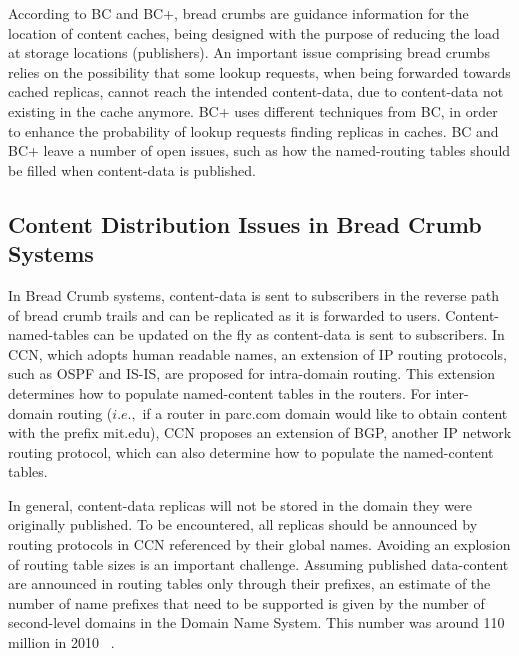 According to BC and BC+, bread crumbs are guidance information for the location of content caches,
being designed with the purpose of reducing the load at storage locations (publishers).
An important issue comprising bread crumbs relies on the possibility that some lookup requests, 
when being forwarded towards cached replicas, cannot reach the intended content-data,
due to content-data not existing in the cache anymore. BC+ uses different techniques from BC, 
in order to enhance the probability of lookup requests finding replicas in caches. BC and BC+ leave a number of open 
issues, such as how the named-routing tables should be filled when content-data is published.





\subsection{Content Distribution Issues in Bread Crumb Systems}


In Bread Crumb systems, content-data is sent to subscribers in the reverse path of bread crumb trails and  
 can be replicated as it is forwarded to users. Content-named-tables can be updated on the fly as content-data 
is sent to subscribers. In CCN, which adopts human readable names, an extension of IP routing protocols, such as OSPF and IS-IS, are proposed for intra-domain routing.  This extension determines how to populate named-content tables in the routers. For inter-domain routing ($i.e.,$ if a router in parc.com domain would like to obtain content 
with the prefix mit.edu), CCN proposes an extension of BGP, another IP network routing protocol, which can also determine how to populate the
named-content tables. 


In general, content-data replicas will not be stored in the domain they were originally published. 
To be encountered, all replicas should be announced by routing protocols in CCN referenced by their global names.  
Avoiding an  explosion of routing table sizes is an important challenge. Assuming published data-content are announced in routing tables only  through their prefixes, an estimate of the number of name prefixes that need to be supported is given by the number of second-level domains 
in the Domain Name System. This number was around 110 million in 2010 ~\cite{netinf}. 





